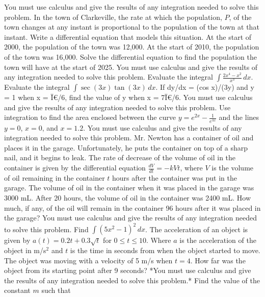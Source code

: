 \documentclass[12pt,addpoints]{exam}
\begin{document}
\begin{questions}
You must use calculus and give the results of any integration needed to solve this problem.
\fillwithlines{5cm}
\question[5] In the town of Clarkeville, the rate at which the population, \( P \), of the town changes at any instant is proportional to the population of the town at that instant. Write a differential equation that models this situation.
\fillwithlines{5cm}
\question[5] At the start of 2000, the population of the town was 12,000. At the start of 2010, the population of the town was 16,000. Solve the differential equation to find the population the town will have at the start of 2025. You must use calculus and give the results of any integration needed to solve this problem.
\fillwithlines{5cm}
\question[5] Evaluate the integral \(\int \frac{2x^4 - x^2}{x^3} \, dx\).
\fillwithlines{5cm}
\question[5] Evaluate the integral \(\int \sec(3x) \tan(3x) \, dx\).
\fillwithlines{5cm}
\question[5] If dy/dx = (cos x)/(3y) and y = 1 when x = Ï€/6, find the value of y when x = 7Ï€/6. You must use calculus and give the results of any integration needed to solve this problem.
\fillwithlines{5cm}
\question[5] Use integration to find the area enclosed between the curve \( y = e^{2x} - \frac{1}{e^{3x}} \) and the lines \( y = 0 \), \( x = 0 \), and \( x = 1.2 \). You must use calculus and give the results of any integration needed to solve this problem.
\fillwithlines{5cm}
\question[5] Mr. Newton has a container of oil and places it in the garage. Unfortunately, he puts the container on top of a sharp nail, and it begins to leak. The rate of decrease of the volume of oil in the container is given by the differential equation \(\frac{dV}{dt} = -kVt\), where \(V\) is the volume of oil remaining in the container \(t\) hours after the container was put in the garage. The volume of oil in the container when it was placed in the garage was 3000 mL. After 20 hours, the volume of oil in the container was 2400 mL. How much, if any, of the oil will remain in the container 96 hours after it was placed in the garage? You must use calculus and give the results of any integration needed to solve this problem.
\fillwithlines{5cm}
\question[5] Find \( \int (5x^2 - 1)^2 \, dx \).
\fillwithlines{5cm}
\question[5] The acceleration of an object is given by \( a(t) = 0.2t + 0.3\sqrt{t} \) for \( 0 \leq t \leq 10 \). Where \( a \) is the acceleration of the object in m/s\(^2\) and \( t \) is the time in seconds from when the object started to move. The object was moving with a velocity of 5 m/s when \( t = 4 \). How far was the object from its starting point after 9 seconds? *You must use calculus and give the results of any integration needed to solve this problem.*
\fillwithlines{5cm}
\question[5] Find the value of the constant \( m \) such that


\end{questions}
\end{document}
